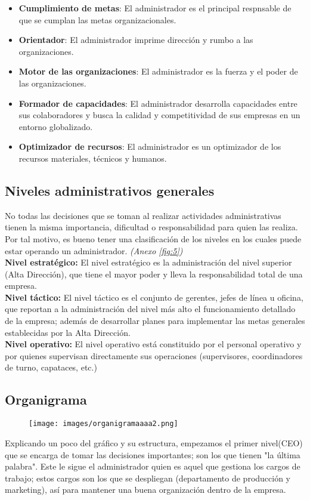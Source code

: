\documentclass[letterpaper,12pt]{article}
\begin{document}
\begin{sloppypar}
\begin{itemize}
    \item \textbf{Cumplimiento de metas}: El administrador es el principal respnsable de que se cumplan las metas organizacionales.
    \item \textbf{Orientador}: El administrador imprime dirección y rumbo a las organizaciones.
    \item \textbf{Motor de las organizaciones}: El administrador es la fuerza y el poder de las organizaciones.
    \item \textbf{Formador de capacidades}: El administrador desarrolla capacidades entre sus colaboradores y busca la calidad y competitividad de sus empresas en un entorno globalizado.
    \item \textbf{Optimizador de recursos}: El administrador es un optimizador de los recursos materiales, técnicos y humanos.
\end{itemize}
\newpage
\subsection{Niveles administrativos generales}
No todas las decisiones que se toman al realizar actividades administrativas tienen la misma importancia, dificultad o responsabilidad para quien las realiza. Por tal motivo, es bueno tener una clasificación de los niveles en los cuales puede estar operando un administrador. \textit{(Anexo \ref{fig:5})}
\vspace{0.3cm}\\ 
\textbf{Nivel estratégico:} El nivel estratégico es la administración del nivel superior (Alta Dirección), que tiene el mayor poder y lleva la responsabilidad total de una empresa.
\vspace{0.3cm}\\ 
\textbf{Nivel táctico:} El nivel táctico es el conjunto de gerentes, jefes de línea u oficina, que reportan a la administración del nivel más alto el funcionamiento detallado de la empresa; además de desarrollar planes para implementar las metas generales establecidas por la Alta Dirección.
\vspace{0.3cm}\\ 
\textbf{Nivel operativo:} El nivel operativo está constituido por el personal operativo y por quienes supervisan directamente sus operaciones (supervisores, coordinadores de turno, capataces, etc.)

\subsection{Organigrama}
\begin{figure}[H]
    \centering 
    \texttt{[image: images/organigramaaaa2.png]}
\end{figure}
Explicando un poco del gráfico y su estructura, empezamos el primer nivel(CEO) que se encarga de tomar las decisiones importantes; son los que tienen "la última palabra". Este le sigue el administrador quien es aquel que gestiona los cargos de trabajo; estos cargos son los que se despliegan (departamento de producción y marketing), así para mantener una buena organización dentro de la empresa.


\end{sloppypar}
\end{document}
